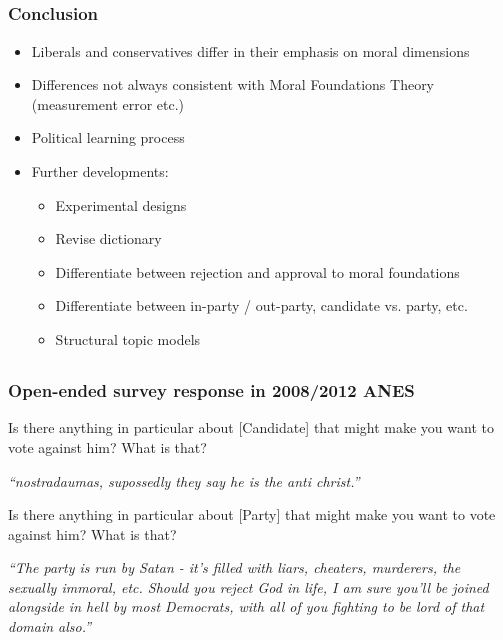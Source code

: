 \documentclass{beamer}
\begin{document}
\subsection{}
\begin{frame}%
  \frametitle{Conclusion}
  \begin{itemize}
\item Liberals and conservatives differ in their emphasis on moral dimensions
\item Differences not always consistent with Moral Foundations Theory (measurement error etc.)
\item Political learning process
\vspace{\baselineskip}
\item Further developments:
    \begin{itemize}
     \item Experimental designs
     \item Revise dictionary
     \item Differentiate between rejection and approval to moral foundations
     \item Differentiate between in-party / out-party, candidate vs. party, etc.
     \item Structural topic models \citep{roberts2014structural}
    \end{itemize}
  \end{itemize}
\end{frame}

\subsection{}
\begin{frame}%
\frametitle{Open-ended survey response in 2008/2012 ANES}
\begin{exampleblock}{Is there anything in particular about [Candidate] that might make you want to vote against him? What is that?}
  \begin{center}
    \textit{``nostradaumas, supossedly they say he is the anti christ.''}
  \end{center}
\end{exampleblock}
\begin{exampleblock}{Is there anything in particular about [Party] that might make you want to vote against him? What is that?}
  \begin{center}
    \textit{``The party is run by Satan - it's filled with liars, cheaters, murderers, the sexually immoral, etc. Should you reject God in life, I am sure you'll be joined alongside in hell by most Democrats, with all of you fighting to be lord of that domain also.''}
  \end{center}
\end{exampleblock}
\end{frame}
\end{document}
